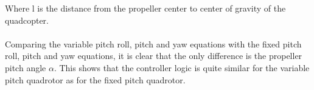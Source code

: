 Where l is the distance from the propeller center to center of gravity of the quadcopter.
\\\\
Comparing the variable pitch roll, pitch and yaw equations with the fixed pitch roll, pitch and yaw equations, it is clear that the only difference is the propeller pitch angle $\alpha$. This shows that the controller logic is quite similar for the variable pitch quadrotor as for the fixed pitch quadrotor.

